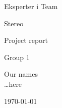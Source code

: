 \begin{titlepage}
\begin{center}
\vspace*{1in}
{\LARGE Eksperter i Team}
\par
\vspace{1cm}


\begin{figure}[ht!]
\centering
\label{overflow}
\end{figure}


{\LARGE Stereo}
\par
\vspace{0.6in}
{\LARGE Project report}
\par
\vspace{0.2in}
{\Large Group 1}
\par
\vfill
\par
\vspace{0.5in}
Our names\\ \ldots here\\
\par
\vspace{0.4cm}
\today
\end{center}
\end{titlepage}
